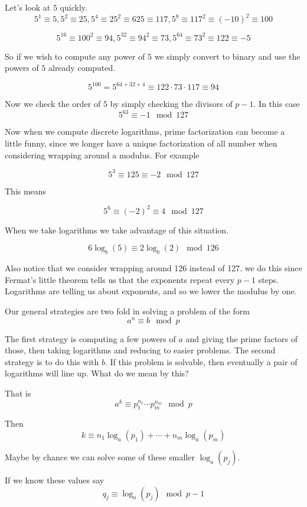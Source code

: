 \documentclass[16 pt]{amsart}
\theoremstyle{definition}
\theoremstyle{remark}
\numberwithin{equation}{subsection}
\begin{document}
Let's look at $5$ quickly.
\[
5^1 \equiv 5, 5^2 \equiv 25, 5^4 \equiv 25^2 \equiv 625 \equiv 117, 5^8 \equiv 117^2 \equiv (-10)^2 \equiv 100
\]

\[
5^{16} \equiv 100^2 \equiv 94, 5^{32} \equiv 94^2 \equiv 73, 5^{64} \equiv 73^2 \equiv 122 \equiv -5
\]

So if we wish to compute any power of $5$ we simply convert to binary and use the powers of $5$ already computed.

\[
5^{100} = 5^{64+32+4} \equiv 122\cdot 73 \cdot 117 \equiv 94
\]

Now we check the order of $5$ by simply checking the divisors of $p-1$.  In this case
\[
5^{63} \equiv -1 \mod{127}
\]



Now when we compute discrete logarithms, prime factorization can become a little funny, since we longer have a unique factorization of all number when considering wrapping around a modulus.  For example

\[
5^3 \equiv 125 \equiv -2 \mod{127}
\]

This means

\[
5^6 \equiv (-2)^2 \equiv 4 \mod{127}
\]

When we take logarithms we take advantage of this situation.

\[
6\log_{b}(5) \equiv 2\log_{b}(2) \mod{126} 
\]

Also notice that we consider wrapping around 126 instead of 127.  we do this since Fermat's little theorem tells us that the exponents repeat every $p-1$ steps.  Logarithms are telling us about exponents, and so we lower the modulus by one.


Our general strategies are two fold in solving a problem of the form 
\[
a^n \equiv b \mod{p}
\]

The first strategy is computing a few powers of $a$ and giving the prime factors of those, then taking logarithms and reducing to easier problems.  The second strategy is to do this with $b$.  If this problem is solvable, then eventually a pair of logarithms will line up.  What do we mean by this?


That is
\[
a^k \equiv p_1^{n_1}\cdots p_m^{n_m} \mod{p}
\]

Then 
\[
k \equiv n_1 \log_a(p_1) + \cdots + n_m \log_a(p_m)
\]

Maybe by chance we can solve some of these smaller $\log_a(p_j)$.

If we know these values say
\[
q_j \equiv \log_a(p_j) \mod{p-1}
\]
\end{document}
